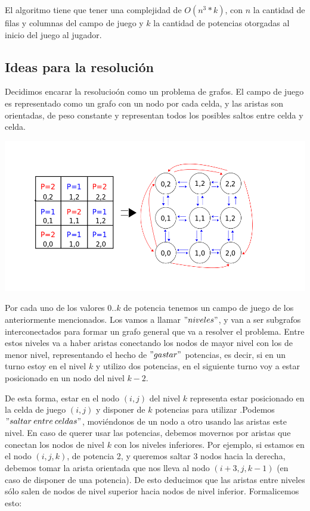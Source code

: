 El algoritmo tiene que tener una complejidad de $O(n^3*k)$, con $n$ la cantidad de filas y columnas del campo de juego y $k$ la cantidad de potencias otorgadas al inicio del juego al jugador.
\vspace{2mm}
\subsection{Ideas para la resoluci\'on} \label{ej_3:idea}

Decidimos encarar la resolucio\'on como un problema de grafos. El campo de juego es representado como un grafo con un nodo por cada celda, y las aristas son orientadas, de peso constante y representan todos los posibles saltos entre celda y celda. 

\includegraphics[scale=0.5]{images/grafo1}

\vspace{2mm}


Por cada uno de los valores $0..k$ de potencia tenemos un campo de juego de los anteriormente mencionados. Los vamos a llamar $"niveles"$, y van a ser subgrafos interconectados para formar un grafo general que va a resolver el problema. Entre estos niveles va a haber aristas conectando los nodos de mayor nivel con los de menor nivel, representando el hecho de $"gastar"$ potencias, es decir, si en un turno estoy en el nivel $k$ y utilizo dos potencias, en el siguiente turno voy a estar posicionado en un nodo del nivel $k-2$.

\vspace{2mm}

De esta forma, estar en el nodo $(i,j)$ del nivel $k$ representa estar posicionado en la celda de juego $(i,j)$ y disponer de $k$ potencias para utilizar .Podemos $"saltar \: entre \: celdas"$, movi\'endonos de un nodo a otro usando las aristas este nivel. En caso de querer usar las potencias, debemos movernos por aristas que conectan los nodos de nivel $k$ con los niveles inferiores. Por ejemplo, si estamos en el nodo $(i,j,k)$, de potencia 2, y queremos saltar 3 nodos hacia la derecha, debemos tomar la arista orientada que nos lleva al nodo $(i+3,j,k-1)$ (en caso de disponer de una potencia). De esto deducimos que las aristas entre niveles s\'olo salen de nodos de nivel superior hacia nodos de nivel inferior. Formalicemos esto:

